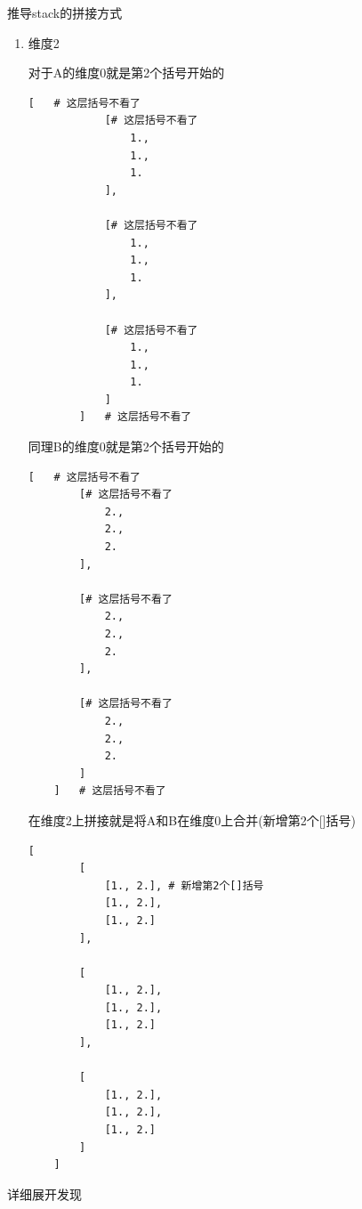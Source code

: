 \begin{derivation}{推导stack的拼接方式}
\begin{enumerate}[label=\arabic*)]
\begin{lstlisting}[style=demostyle,numbers=none]
           [
             [1., 1., 1.],
             [2., 2., 2.]
            ]
        ]
        \end{lstlisting}

        \item 维度2

        对于A的维度0就是第2个括号开始的
        \begin{lstlisting}[style=demostyle,numbers=none]
        [   # 这层括号不看了
            [# 这层括号不看了
                1.,
                1., 
                1.
            ],

            [# 这层括号不看了
                1., 
                1., 
                1.
            ],

            [# 这层括号不看了
                1., 
                1., 
                1.
            ]
        ]   # 这层括号不看了
    \end{lstlisting}

    同理B的维度0就是第2个括号开始的
    \begin{lstlisting}[style=demostyle,numbers=none]
    [   # 这层括号不看了
        [# 这层括号不看了
            2.,
            2., 
            2.
        ],

        [# 这层括号不看了
            2., 
            2., 
            2.
        ],

        [# 这层括号不看了
            2., 
            2., 
            2.
        ]
    ]   # 这层括号不看了
    \end{lstlisting}

    在维度2上拼接就是将A和B在维度0上合并(新增第2个[]括号)
    \begin{lstlisting}[style=demostyle,numbers=none]
    [
        [ 
            [1., 2.], # 新增第2个[]括号
            [1., 2.],
            [1., 2.]
        ],

        [
            [1., 2.],
            [1., 2.],
            [1., 2.]
        ],

        [
            [1., 2.],
            [1., 2.],
            [1., 2.]
        ]
    ]
    \end{lstlisting}

    \end{enumerate}
    
\end{derivation}

详细展开发现

